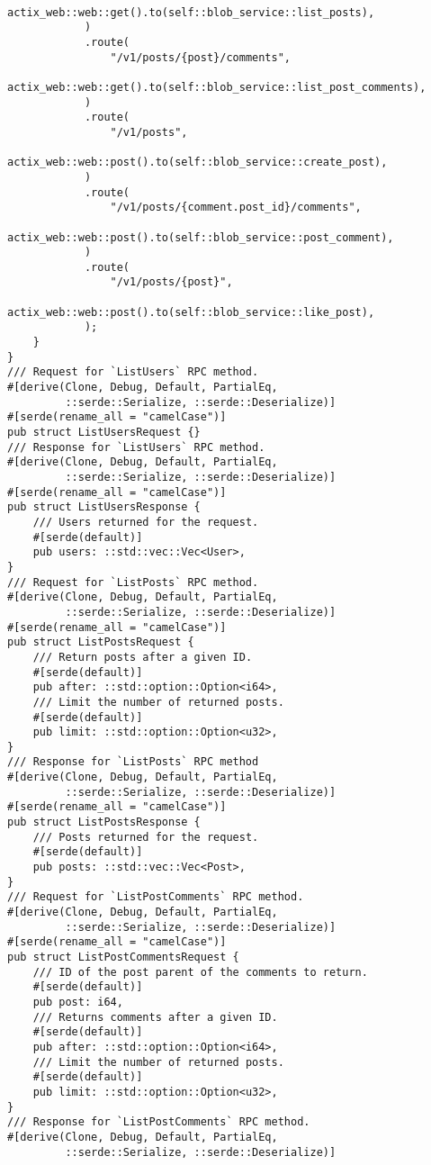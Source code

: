 \begin{verbatim}
                actix_web::web::get().to(self::blob_service::list_posts),
            )
            .route(
                "/v1/posts/{post}/comments",
                actix_web::web::get().to(self::blob_service::list_post_comments),
            )
            .route(
                "/v1/posts",
                actix_web::web::post().to(self::blob_service::create_post),
            )
            .route(
                "/v1/posts/{comment.post_id}/comments",
                actix_web::web::post().to(self::blob_service::post_comment),
            )
            .route(
                "/v1/posts/{post}",
                actix_web::web::post().to(self::blob_service::like_post),
            );
    }
}
/// Request for `ListUsers` RPC method.
#[derive(Clone, Debug, Default, PartialEq,
         ::serde::Serialize, ::serde::Deserialize)]
#[serde(rename_all = "camelCase")]
pub struct ListUsersRequest {}
/// Response for `ListUsers` RPC method.
#[derive(Clone, Debug, Default, PartialEq,
         ::serde::Serialize, ::serde::Deserialize)]
#[serde(rename_all = "camelCase")]
pub struct ListUsersResponse {
    /// Users returned for the request.
    #[serde(default)]
    pub users: ::std::vec::Vec<User>,
}
/// Request for `ListPosts` RPC method.
#[derive(Clone, Debug, Default, PartialEq,
         ::serde::Serialize, ::serde::Deserialize)]
#[serde(rename_all = "camelCase")]
pub struct ListPostsRequest {
    /// Return posts after a given ID.
    #[serde(default)]
    pub after: ::std::option::Option<i64>,
    /// Limit the number of returned posts.
    #[serde(default)]
    pub limit: ::std::option::Option<u32>,
}
/// Response for `ListPosts` RPC method
#[derive(Clone, Debug, Default, PartialEq,
         ::serde::Serialize, ::serde::Deserialize)]
#[serde(rename_all = "camelCase")]
pub struct ListPostsResponse {
    /// Posts returned for the request.
    #[serde(default)]
    pub posts: ::std::vec::Vec<Post>,
}
/// Request for `ListPostComments` RPC method.
#[derive(Clone, Debug, Default, PartialEq,
         ::serde::Serialize, ::serde::Deserialize)]
#[serde(rename_all = "camelCase")]
pub struct ListPostCommentsRequest {
    /// ID of the post parent of the comments to return.
    #[serde(default)]
    pub post: i64,
    /// Returns comments after a given ID.
    #[serde(default)]
    pub after: ::std::option::Option<i64>,
    /// Limit the number of returned posts.
    #[serde(default)]
    pub limit: ::std::option::Option<u32>,
}
/// Response for `ListPostComments` RPC method.
#[derive(Clone, Debug, Default, PartialEq,
         ::serde::Serialize, ::serde::Deserialize)]

\end{verbatim}
